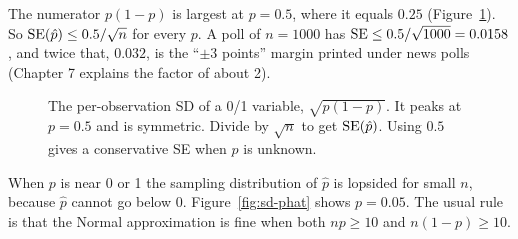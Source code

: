 The numerator $p(1-p)$ is largest at $p=0.5$, where it equals $0.25$
(Figure~\ref{fig:sd-pq}). So $\operatorname{SE}(\hat p)\le 0.5/\sqrt n$ for every $p$. A poll of
$n=1000$ has $\operatorname{SE}\le 0.5/\sqrt{1000}=0.0158$, and twice that, $0.032$, is the
``$\pm 3$ points'' margin printed under news polls (Chapter 7 explains the factor
of about 2).

\begin{figure}[H]
\centering
{}
\caption{The per-observation SD of a 0/1 variable, $\sqrt{p(1-p)}$. It peaks at
$p=0.5$ and is symmetric. Divide by $\sqrt n$ to get $\operatorname{SE}(\hat p)$. Using $0.5$
gives a conservative SE when $p$ is unknown.}
\label{fig:sd-pq}
\end{figure}

When $p$ is near 0 or 1 the sampling distribution of $\hat p$ is lopsided for small
$n$, because $\hat p$ cannot go below 0. Figure~\ref{fig:sd-phat} shows $p=0.05$.
The usual rule is that the Normal approximation is fine when both $np\ge 10$ and
$n(1-p)\ge 10$.

